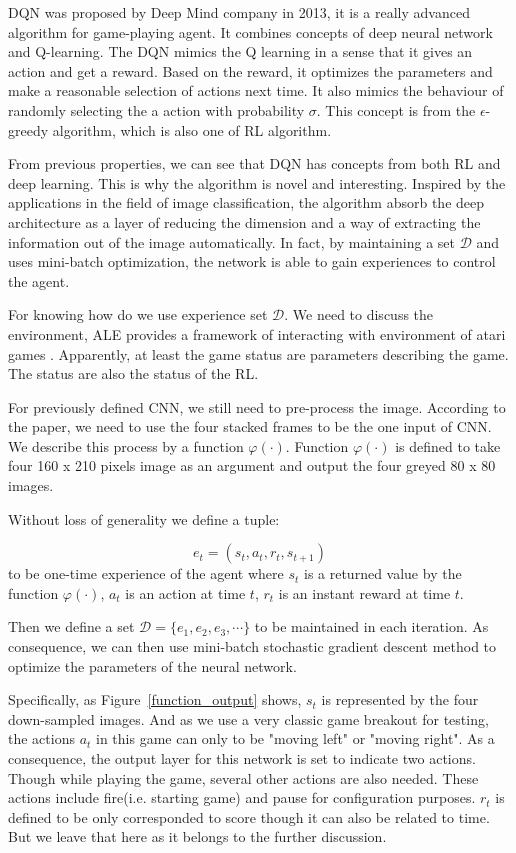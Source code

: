 \documentclass{article}
\begin{document}
DQN was proposed by Deep Mind company in 2013, it is a really advanced algorithm for game-playing agent. It combines concepts of deep neural network and Q-learning. The DQN mimics the Q learning in a sense that it gives an action and get a reward. Based on the reward, it optimizes the parameters and make a reasonable selection of actions next time. It also mimics the behaviour of randomly selecting the a action with probability $\sigma$. This concept is from the $\epsilon$-greedy algorithm, which is also one of RL algorithm.

From previous properties, we can see that DQN has concepts from both RL and deep learning. This is why the algorithm is novel and interesting. Inspired by the applications in the field of image classification, the algorithm absorb the deep architecture as a layer of reducing the dimension and a way of extracting the information out of the image automatically.  In fact, by maintaining a set $\mathcal{D}$ and uses mini-batch optimization, the network is able to gain experiences to control the agent\cite{mnih2013playing}.

For knowing how do we use experience set $\mathcal{D}$. We need to discuss the environment, ALE provides a framework of interacting with environment of atari games . Apparently, at least the game status are parameters describing the game. The status are also the status of the RL.

For previously defined CNN, we still need to pre-process the image. According to the paper\cite{mnih2013playing}, we need to use the four stacked frames to be the one input of CNN. We describe this process by a function $\varphi(\cdot)$. Function $\varphi(\cdot)$ is defined to take four 160 x 210 pixels image as an argument and output the four greyed 80 x 80 images.

Without loss of generality we define a tuple:

$$e_t = (s_t, a_t, r_t, s_{t+1})$$ to be one-time experience of the agent where $s_t$ is a returned value by the function $\varphi(\cdot)$, $a_t$ is an action at time $t$, $r_t$ is an instant reward at time $t$.  

Then we define a set $\mathcal{D} = \{e_1, e_2, e_3, \cdots\}$ to be maintained in each iteration. As consequence, we can then use mini-batch stochastic gradient descent method to optimize the parameters of the neural network.

Specifically, as Figure~\ref{function_output} shows, $s_t$ is represented by the four down-sampled images. And as we use a very classic game breakout for testing, the actions $a_t$ in this game can only to be "moving left" or "moving right". As a consequence, the output layer for this network is set to indicate two actions. Though while playing the game, several other actions are also needed. These actions include fire(i.e. starting game) and pause for configuration purposes.  $r_t$ is defined to be only corresponded to score though it can also be related to time. But we leave that here as it belongs to the further discussion.
\end{document}
